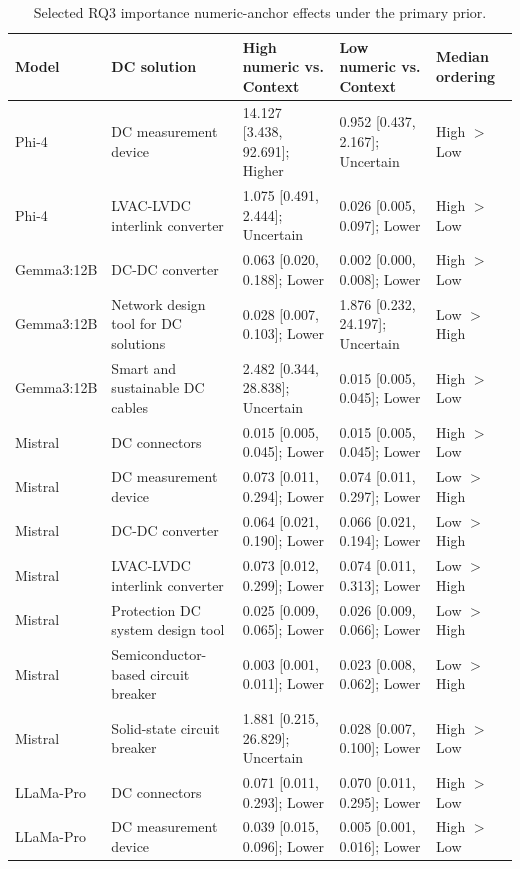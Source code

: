 \begin{table}[tbp]
\caption{Selected RQ3 importance numeric-anchor effects under the primary prior.}
\label{tab:rq3-importance-selected-numeric}
\begin{tabular}{p{1.8cm}p{4.0cm}p{3.7cm}p{3.7cm}p{1.8cm}}
\toprule
Model & DC solution & High numeric vs. Context & Low numeric vs. Context & Median ordering \\
\midrule
Phi-4 & DC measurement device & 14.127 [3.438, 92.691]; Higher & 0.952 [0.437, 2.167]; Uncertain & High $>$ Low \\
Phi-4 & LVAC-LVDC interlink converter & 1.075 [0.491, 2.444]; Uncertain & 0.026 [0.005, 0.097]; Lower & High $>$ Low \\
Gemma3:12B & DC-DC converter & 0.063 [0.020, 0.188]; Lower & 0.002 [0.000, 0.008]; Lower & High $>$ Low \\
Gemma3:12B & Network design tool for DC solutions & 0.028 [0.007, 0.103]; Lower & 1.876 [0.232, 24.197]; Uncertain & Low $>$ High \\
Gemma3:12B & Smart and sustainable DC cables & 2.482 [0.344, 28.838]; Uncertain & 0.015 [0.005, 0.045]; Lower & High $>$ Low \\
Mistral & DC connectors & 0.015 [0.005, 0.045]; Lower & 0.015 [0.005, 0.045]; Lower & High $>$ Low \\
Mistral & DC measurement device & 0.073 [0.011, 0.294]; Lower & 0.074 [0.011, 0.297]; Lower & Low $>$ High \\
Mistral & DC-DC converter & 0.064 [0.021, 0.190]; Lower & 0.066 [0.021, 0.194]; Lower & Low $>$ High \\
Mistral & LVAC-LVDC interlink converter & 0.073 [0.012, 0.299]; Lower & 0.074 [0.011, 0.313]; Lower & Low $>$ High \\
Mistral & Protection DC system design tool & 0.025 [0.009, 0.065]; Lower & 0.026 [0.009, 0.066]; Lower & Low $>$ High \\
Mistral & Semiconductor-based circuit breaker & 0.003 [0.001, 0.011]; Lower & 0.023 [0.008, 0.062]; Lower & Low $>$ High \\
Mistral & Solid-state circuit breaker & 1.881 [0.215, 26.829]; Uncertain & 0.028 [0.007, 0.100]; Lower & High $>$ Low \\
LLaMa-Pro & DC connectors & 0.071 [0.011, 0.293]; Lower & 0.070 [0.011, 0.295]; Lower & High $>$ Low \\
LLaMa-Pro & DC measurement device & 0.039 [0.015, 0.096]; Lower & 0.005 [0.001, 0.016]; Lower & High $>$ Low \\

\end{tabular}
\end{table}
